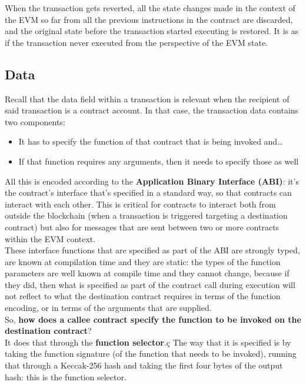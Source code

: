 When the transaction gets reverted, all the state changes made in the context of the EVM so far from all the previous instructions in the contract are discarded, and the original state before the transaction started executing is restored. It is as if the transaction never executed from the perspective of the EVM state.

\subsection*{Data}
Recall that the data field within a transaction is relevant when the recipient of said transaction is a contract account.
In that case, the transaction data contains two components:

\begin{itemize}

    \item It has to specify the function of that contract that is being invoked and\dots

    \item If that function requires any arguments, then it needs to specify those as well
\end{itemize}

All this is encoded according to the \textbf{Application Binary Interface (ABI)}: it's the contract's interface that's specified in a standard way, so that contracts can interact with each other.
This is critical for contracts to interact both from outside the blockchain (when a transaction is triggered targeting a destination contract) but also for messages that are sent between two or more contracts within the EVM context.\\

These interface functions that are specified as part of the ABI are strongly typed, are known at compilation time and they are static: the types of the function parameters are well known at compile time and they cannot change, because if they did, then what is specified as part of the contract call during execution will not reflect to what the destination contract requires in terms of the function encoding, or in terms of the arguments that are supplied.\\

So, \textbf{how does a callee contract specify the function to be invoked on the destination contract}?\\

It does that through the \textbf{function selector}.ç
The way that it is specified is by taking the function signature (of the function that needs to be invoked), running that through a Keccak-256 hash and taking the first four bytes of the output hash: this is the function selector.\\

